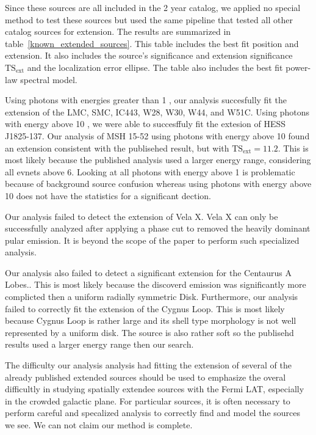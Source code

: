 \documentclass[12pt,preprint]{aastex}
\newcommand{\gev}{\text{GeV}\xspace}
\newcommand{\tsext}{{\ensuremath{\text{TS}_\text{ext}}}\xspace}
\newcommand{\ts}{\text{TS}\xspace}
\begin{document}
Since these sources are all included in the 2 year catalog, we applied
no special method to test these sources but used the same pipeline
that tested all other catalog sources for extension.  The results are
summarized in table~\ref{known_extended_sources}.  This table includes
the best fit position and extension. It also includes the source's
significance \ts and extension significance \tsext and the localization
error ellipse. The table also includes the best fit power-law spectral
model.

Using photons with energies greater than 1 \gev, our analysis succesfully
fit the extension of the LMC, SMC, IC443, W28, W30, W44, and W51C.
Using photons with energy above 10 \gev, we were able to succesffuly
fit the extesion of HESS J1825-137.
Our analysis of MSH 15-52 using photons with energy above 10 \gev found an extension
consistent with the publisehed result, but with $\tsext=11.2$. This is
most likely because the published analysis used a larger energy range,
considering all evnets above 6\gev. Looking at all photons with
energy above 1\gev 
is problematic because of background source confusion whereas using photons
with energy above 10\gev does not have the statistics for a significant dection.

Our analysis failed to detect the extension of Vela X. Vela X can only be
successfully analyzed after applying a phase cut to removed the heavily
dominant pular emission. It is beyond the scope of the paper to perform
such specialized analysis.

Our analysis also failed to detect a significant extension for the
Centaurus A Lobes.\cite{CenA paper}. This is most likely because the
discoverd emission was significantly more complicted then a uniform
radially symmetric Disk.  Furthermore, our analysis failed to correctly
fit the extension of the Cygnus Loop\cite{Cygnus Loop Paper}.  This is
most likely because Cygnus Loop is rather large and its shell type
morphology is not well represented by a uniform disk. The source is
also rather soft so the publisehd results used a larger energy range
then our search.

The difficulty our analysis analysis had fitting the extension of several
of the already published extended sources should be used to emphasize the
overal difficultly in studying spatially extendee sources with the Fermi
LAT, especially in the crowded galactic plane. For particular sources,
it is often necessary to perform careful and specalized analysis to
correctly find and model the sources we see. We can not claim our method
is complete.
\end{document}
